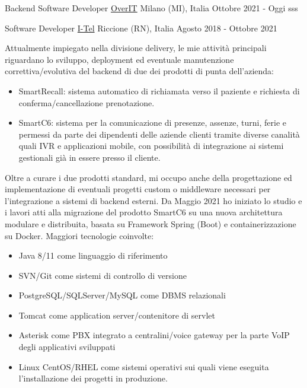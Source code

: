 

\begin{cventries}

\cventry
	{Backend Software Developer} %
	{\href{https://overit.it/}{OverIT}} %
	{Milano (MI), Italia} %
	{Ottobre 2021 - Oggi} %
	{
		sss
	}


\cventry
    {Software Developer} %
    {\href{https://i-tel.it}{I-Tel}} %
    {Riccione (RN), Italia} %
    {Agosto 2018 - Ottobre 2021} %
    {
      	Attualmente impiegato nella divisione delivery, le mie attività principali riguardano lo sviluppo, deployment ed eventuale manutenzione correttiva/evolutiva del backend di due dei prodotti di punta dell'azienda:
      	\begin{itemize}
      		\item {SmartRecall: sistema automatico di richiamata verso il paziente e richiesta di conferma/cancellazione prenotazione.}
      		\item {SmartC6: sistema per la comunicazione di presenze, assenze, turni, ferie e permessi da parte dei dipendenti delle aziende clienti tramite diverse canalità quali IVR e applicazioni mobile, con possibilità di integrazione ai sistemi gestionali già in essere presso il cliente.}
      	\end{itemize}
      	Oltre a curare i due prodotti standard, mi occupo anche della progettazione ed implementazione di eventuali progetti custom o middleware necessari per l'integrazione a sistemi di backend esterni.
      	Da Maggio 2021 ho iniziato lo studio e i lavori atti alla migrazione del prodotto SmartC6 su una nuova architettura modulare e distribuita, basata su Framework Spring (Boot) e containerizzazione su Docker.
      	Maggiori tecnologie coinvolte:
      	\begin{itemize}
      		\item {Java 8/11 come linguaggio di riferimento}
      		\item {SVN/Git come sistemi di controllo di versione}
      		\item {PostgreSQL/SQLServer/MySQL come DBMS relazionali}
      		\item {Tomcat come application server/contenitore di servlet}
      		\item {Asterisk come PBX integrato a centralini/voice gateway per la parte VoIP degli applicativi sviluppati}
      		\item {Linux CentOS/RHEL come sistemi operativi sui quali viene eseguita l'installazione dei progetti in produzione.}
      	\end{itemize}
    }



\end{cventries}
